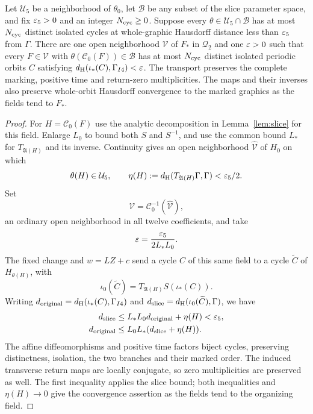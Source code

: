 \begin{lemma}\label{lem:slice-bound-transfer}
Let $\mathcal U_5$ be a neighborhood of $\theta_0$, let
$\mathcal B$ be any subset of the slice parameter space, and fix
$\varepsilon_5>0$ and an integer $N_{\rm cyc}\ge0$.
Suppose every $\theta\in\mathcal U_5\cap\mathcal B$ has at most
$N_{\rm cyc}$ distinct isolated cycles at whole-graphic Hausdorff
distance less than $\varepsilon_5$ from $\Gamma$.
There are one open neighborhood $\mathcal V$ of $F_*$ in
$\mathcal Q_2$ and one $\varepsilon>0$ such that every $F\in\mathcal V$
with $\theta(\mathscr C_0(F))\in\mathcal B$ has at most
$N_{\rm cyc}$ distinct isolated periodic orbits $C$ satisfying
$d_{\rm H}(\iota_*(C),\Gamma_{I4})<\varepsilon$.
The transport preserves the complete
marking, positive time and return-zero multiplicities. The maps and
their inverses also preserve whole-orbit Hausdorff convergence to the
marked graphics as the fields tend to $F_*$.
\end{lemma}
\begin{proof}
For $H=\mathscr C_0(F)$ use the analytic decomposition in
Lemma~\ref{lem:slice} for this field. Enlarge $L_0$ to bound both $S$ and
$S^{-1}$, and use the common bound $L_*$ for
$T_{\mathfrak A(H)}$ and its inverse. Continuity gives an open
neighborhood $\widehat{\mathcal V}$ of $H_0$ on which
\begin{equation}\label{eq:lift-neighborhood}
 \theta(H)\in\mathcal U_5,\qquad
 \eta(H):=d_{\rm H}(T_{\mathfrak A(H)}\Gamma,\Gamma)<\varepsilon_5/2.
\end{equation}
Set
\begin{equation}\label{eq:original-coefficient-neighborhood}
 \mathcal V=\mathscr C_0^{-1}(\widehat{\mathcal V}),
\end{equation}
an ordinary open neighborhood in all twelve coefficients, and take
\begin{equation}\label{eq:original-collar-radius}
 \varepsilon=\frac{\varepsilon_5}{2L_*L_0}.
\end{equation}
The fixed change and $w=LZ+c$ send a cycle $C$ of this same field
to a cycle $\widetilde C$ of $H_{\theta(H)}$, with
\[
 \iota_0(\widetilde C)=T_{\mathfrak A(H)}S(\iota_*(C)).
\]
Writing $d_{\rm original}=d_{\rm H}(\iota_*(C),\Gamma_{I4})$
and $d_{\rm slice}=d_{\rm H}(\iota_0(\widetilde C),\Gamma)$,
we have
\begin{align}
 d_{\rm slice}&\le L_*L_0d_{\rm original}+\eta(H)<\varepsilon_5,
                                      \label{eq:two-map-hausdorff}\\
 d_{\rm original}&\le L_0L_*(d_{\rm slice}+\eta(H)).
                              \label{eq:two-map-hausdorff-reverse}
\end{align}
The affine diffeomorphisms and positive time factors biject cycles,
preserving distinctness, isolation, the two branches and their marked
order. The induced transverse return maps are locally conjugate, so
zero multiplicities are preserved as well. The first inequality applies
the slice bound; both inequalities and $\eta(H)\to0$ give the
convergence assertion as the fields tend to the organizing field.
\end{proof}
